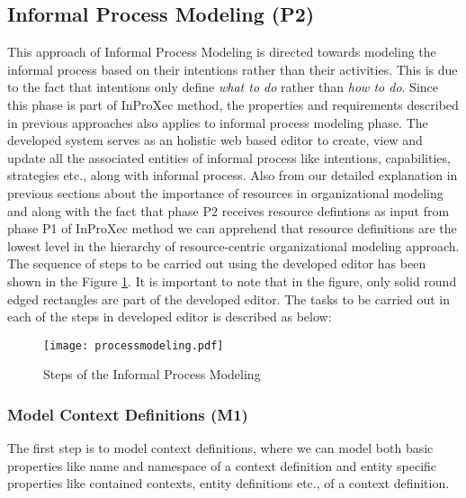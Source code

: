 \subsection{Informal Process Modeling (P2)}
\label{subsec:informalprocessmodeling}
This approach of Informal Process Modeling is directed towards modeling the informal process based on their intentions rather than their activities. This is due to the fact that intentions only define \textit{what to do} rather than \textit{how to do}. Since this phase is part of InProXec method, the properties and requirements described in previous approaches \cite{Sungur2014a,Sungur2015} also applies to informal process modeling phase. The developed system serves as an holistic web based editor to create, view and update all the associated entities of informal process like intentions, capabilities, strategies etc., along with informal process. Also from our detailed explanation in previous sections about the importance of resources in organizational modeling  and along with the fact that phase P2 receives resource defintions as input from phase P1 of InProXec method we can apprehend that resource definitions are the lowest level in the hierarchy of resource-centric organizational modeling approach. The sequence of steps to be carried out using the developed editor has been shown in the Figure  \ref{fig:processdiagram}. It is important to note that in the figure, only solid round edged rectangles are part of the developed editor. The tasks to be carried out in each of the steps in developed editor is described as below:

\begin{figure}
		\centering
		\texttt{[image: processmodeling.pdf]}
		\caption{Steps of the Informal Process Modeling}
		\label{fig:processdiagram}
\end{figure}

\subsubsection{Model Context Definitions (M1)}  
The first step is to model context definitions, where we can model both basic properties like name and namespace of a context definition and entity specific properties like contained contexts, entity definitions etc., of a context definition.  

